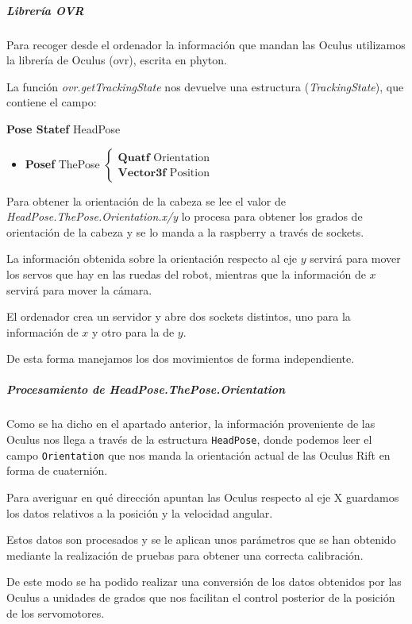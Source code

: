 \documentclass[twoside, 12pt]{epstfg}
\begin{document}
\subparagraph{Librería OVR}
Para recoger desde el ordenador la información que mandan las Oculus utilizamos la librería de Oculus (ovr), escrita en phyton.

La función \textit{ovr.getTrackingState} nos devuelve una estructura (\textit{TrackingState}), que contiene el campo:

\textbf{Pose Statef} HeadPose 
\begin{itemize}
	\item \textbf{Posef} ThePose $\begin{cases}
	\textbf{Quatf} \text{ Orientation}\\
	\textbf{Vector3f}\text{ Position} 
	\end{cases}$
	
	
\end{itemize}

Para obtener la orientación de la cabeza se lee el valor de \textit{HeadPose.ThePose.Orientation.x/y} lo procesa para obtener los grados de orientación de la cabeza y se lo manda a la raspberry a través de sockets.

La información obtenida sobre la orientación respecto al eje $y$ servirá para mover los servos que hay en las ruedas del robot, mientras que la información de $x$ servirá para mover la cámara.


El ordenador crea un servidor y abre dos sockets distintos, uno para la información de $x$ y otro para la de $y$.


De esta forma manejamos los dos movimientos de forma independiente.


\subparagraph{Procesamiento de HeadPose.ThePose.Orientation}

Como se ha dicho en el apartado anterior, la información proveniente de las Oculus nos llega a través de la estructura \texttt{HeadPose}, donde podemos leer el campo \texttt{Orientation} que nos manda la orientación actual de las Oculus Rift en forma de cuaternión.

Para averiguar en qué dirección apuntan las Oculus respecto al eje X guardamos los datos relativos a la posición y la velocidad angular.

 Estos datos son procesados y se le aplican unos parámetros que se han obtenido mediante la realización de pruebas para obtener una correcta calibración.

De este modo se ha podido realizar una conversión de los datos obtenidos por las Oculus a unidades de grados que nos facilitan el control posterior de la posición de los servomotores.
\end{document}
